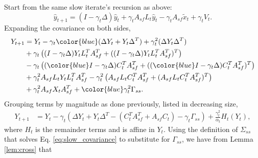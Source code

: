 Start from the same slow iterate's recursion as above:
\begin{equation}
    \hat{y}_{t+1} = (I - \gamma_t \Delta) \hat{y}_t + \gamma_t A_{sf} L_t \hat{y}_t - \gamma_t A_{sf} \tilde{x}_t + \gamma_t V_t .
\end{equation}
Expanding the covariance on both sides,
\begin{align*}
    Y_{t+1} &= Y_t - \gamma_t {\color{blue}(\Delta Y_t + Y_t \Delta^T)} + \gamma_t^2 (\Delta Y_t \Delta^T)
    \\
    &
    + \gamma_t \left((I - \gamma_t \Delta) Y_t L_t^T A_{sf}^T + ((I - \gamma_t \Delta) Y_t L_t^T A_{sf}^T)^T\right)
    \\ & 
    - \gamma_t \left( ({\color{blue}I} - \gamma_t \Delta) C_t^T A_{sf}^T + (({\color{blue}I} - \gamma_t \Delta) C_t^T A_{sf}^T)^T\right)
    \\
    &+ \gamma_t^2 A_{sf} L_t Y_t L_t^T A_{sf}^T
    - \gamma_t^2 \left(A_{sf} L_t C_t^T A_{sf}^T + (A_{sf} L_t C_t^T A_{sf}^T)^T\right) 
    \\
    &+ \gamma_t^2 A_{sf} X_t A_{sf}^T 
    + {\color{blue}\gamma_t^2 \Gamma_{ss} } .
\end{align*}
Grouping terms by magnitude as done previously, listed in decreasing size,
\begin{align*}
    Y_{t+1} &= Y_t
    - \gamma_t \left(\Delta Y_t + Y_t \Delta^T - (C_t^T A_{sf}^T + A_{sf} C_t) - \gamma_t \Gamma_{ss}  \right)
    + \frac{\gamma_t^2}{\alpha_t} H_t (Y_t) ,
\end{align*}
where $H_t$ is the remainder terms and is affine in $Y_t$.
Using the definition of $\Sigma_{ss}$ that solves Eq. \eqref{eq:slow_covariance} to substitute for $\Gamma_{ss}$, we have from Lemma \ref{lem:cross} that






